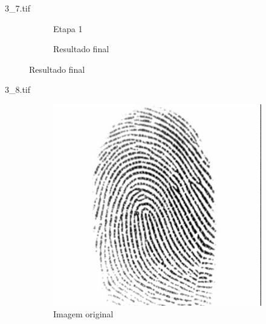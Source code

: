 \documentclass{beamer}
\begin{document}
\begin{frame}{3\_7.tif}
\begin{figure}
\begin{subfigure}[!ht]{0.32\textwidth}
                \caption{Etapa 1}
            \end{subfigure}
            \begin{subfigure}[!ht]{0.32\textwidth}
                \caption{Resultado final}
            \end{subfigure}
        \end{figure}
    \end{frame}

    \begin{frame}{3\_8.tif}
        \begin{figure}
            \centering
            \begin{subfigure}[!ht]{0.32\textwidth}
                \includegraphics[width=\columnwidth]{Fingerprints/3_8.jpg}
                \caption{Imagem original}
            \end{subfigure}
            \begin{subfigure}[!ht]{0.32\textwidth}

\end{subfigure}
\end{figure}
\end{frame}
\end{document}
